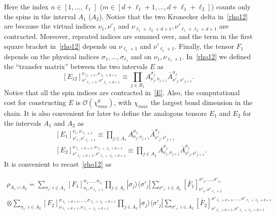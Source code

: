 \documentclass[twocolumn,superscriptaddress,prb,10pt]{revtex4-1}
\begin{document}
Here the index $n\in[1,\dots,\ell_1]$ ($m\in[d+\ell_1+1,\dots,d+\ell_1+\ell_2]$) counts 
only the spins in the interval $A_1$ ($A_2$). Notice that the two Kronecker delta 
in~\eqref{rho12} are because the virtual indices $\nu_1,\nu'_1$ and 
$\nu_{\ell_1+\ell_2+d+1},\nu'_{\ell_1+\ell_2+d+1}$ are contracted. Moreover, repeated 
indices are summed over, and the term in the first square bracket in~\eqref{rho12} 
depends on $\nu_{\ell_1+1}$ and $\nu'_{\ell_1+1}$. Finally, the tensor $F_1$ depends on 
the physical indices $\sigma_1,\dots,\sigma_{\ell_1}$ and on $\nu_1,\nu_{\ell_1+1}$.
In~\eqref{rho12} we defined the ``transfer matrix'' between the two intervals $E$ as 
%
\begin{equation}
\label{E}
[E_{12}]^{\nu_{\ell_1+1},\nu_{\ell_1+d+1}}_{\nu'_{\ell_1+1},\nu'_{\ell_1+d+1}}\equiv 
\prod\limits_{j\in B_1}A^{\sigma_j}_{\nu_j,\nu_{j+1}}
\bar A^{\sigma_j}_{\nu'_j,\nu'_{j+1}}. 
\end{equation}
%
Notice that all the spin indices are contracted in~\eqref{E}. Also, the computational 
cost for constructing $E$ is ${\mathcal O}(\chi^6_{max})$, with $\chi_{max}$ the 
largest bond dimension in the chain. 
It is also convenient for later to define the analogous tensors $E_1$ and $E_2$ for 
the intervals $A_1$ and $A_2$ as 
%
\begin{align}
& [E_1]^{\nu_1,\nu_{\ell_1+1}}_{\nu'_1,\nu'_{\ell_1+1}}\equiv
\prod\limits_{j\in A_1}A^{\sigma_j}_{\nu_j,\nu_{j+1}}
\bar A^{\sigma_j}_{\nu'_j,\nu'_{j+1}}\\
& [E_2]^{\nu_{\ell_1+d+1},\nu_{\ell_1+\ell_2+d+1}}_{\nu'_{\ell_1+d+1},
\nu'_{\ell_1+\ell_2+d+1}}\equiv
\prod\limits_{j\in A_2}A^{\sigma_j}_{\nu_j,\nu_{j+1}}
\bar A^{\sigma_j}_{\nu'_j,\nu'_{j+1}}.
\end{align}
%
It is convenient to recast~\eqref{rho12} as 
%
\begin{widetext}
\begin{multline}
\rho_{A_1\cup A_2}=\sum_{\sigma_i:\, i\in A_1}
[F_1]^{\sigma_1,\dots,\sigma_{\ell_1}}_{\nu_1,\nu_{\ell_1+1}}\prod_{j\in A_1}|\sigma_j\rangle
\langle\sigma'_j|\sum_{\sigma'_i:\, i\in A_1}
[\bar F_1]^{\sigma'_1,\dots,\sigma'_{\ell_1}}_{\nu'_1,\nu'_{\ell_1+1}}\\
\otimes\sum_{\sigma_i:\, i\in A_2}
[F_2]^{\sigma_{\ell_1+d+1},\dots,\sigma_{\ell_1+\ell_2+d+1}}_{\nu_{\ell_1+d+1},
\nu_{\ell_1+\ell_2+d+1}}\prod_{j\in A_2}|\sigma_j\rangle\langle\sigma'_j|
\sum_{\sigma'_i:\, i\in A_2}
[\bar F_2]^{\sigma'_{\ell_1+d+1},\dots,\sigma'_{\ell_1+\ell_2+d+1}}_{\nu'_{\ell_1+d+1},
\nu'_{\ell_1+\ell_2+d+1}}
\end{multline}
\end{widetext}
%
\end{document}
